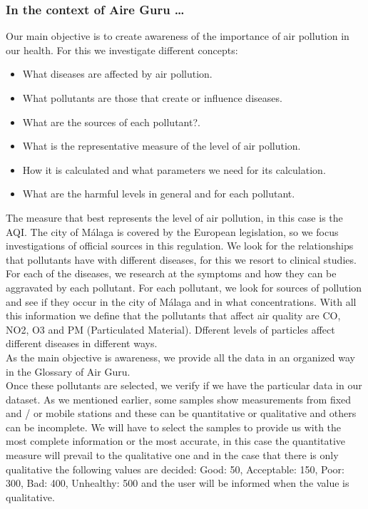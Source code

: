 \subsubsection*{In the context of Aire Guru \ldots}

Our main objective is to create awareness of the importance of air pollution in our health. For this we investigate different concepts:

\begin{itemize}
    \item What diseases are affected by air pollution.
    \item What pollutants are those that create or influence diseases.
    \item What are the sources of each pollutant?.
    \item What is the representative measure of the level of air pollution.
    \item How it is calculated and what parameters we need for its calculation.
    \item What are the harmful levels in general and for each pollutant.
\end{itemize}

The measure that best represents the level of air pollution, in this case is the AQI. The city of Málaga is covered by the European legislation, 
so we focus investigations of official sources in this regulation.
We look for the relationships that pollutants have with different diseases, for this we resort to clinical studies. For each of the diseases, we 
research at the symptoms and how they can be aggravated by each pollutant.
For each pollutant, we look for sources of pollution and see if they occur in the city of Málaga and in what concentrations.
With all this information we define that the pollutants that affect air quality are CO, NO2, O3 and PM (Particulated Material). Dfferent levels of particles
affect different diseases in different ways. \\

As the main objective is awareness, we provide all the data in an organized way in the Glossary of Air Guru. \\

Once these pollutants are selected, we verify if we have the particular data in our dataset. As we mentioned earlier, some samples show measurements 
from fixed and / or mobile stations and these can be quantitative or qualitative and others can be incomplete. We will have to select the
samples to provide us with the most complete information or the most accurate, in this case the quantitative measure will prevail to the qualitative 
one and in the case that there is only qualitative
the following values are decided: Good: 50, Acceptable: 150, Poor: 300, Bad: 400, Unhealthy: 500 and the user will be informed when the value is qualitative. \\

